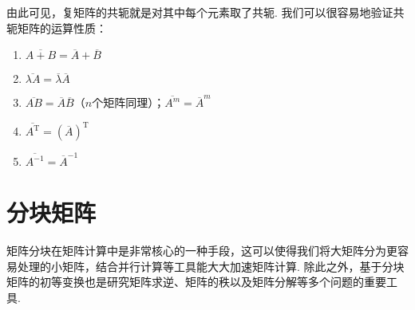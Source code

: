 由此可见，复矩阵的共轭就是对其中每个元素取了共轭. 我们可以很容易地验证共轭矩阵的运算性质：
\begin{enumerate}
    \item $\overline{A+B}=\overline{A}+\overline{B}$

    \item $\overline{\lambda A}=\overline{\lambda}\overline{A}$

    \item $\overline{AB}=\overline{A}\overline{B}$（$n$个矩阵同理）；$\overline{A^m}=\overline{A}^m$

    \item $\overline{A^\mathrm{T}}=(\overline{A})^\mathrm{T}$

    \item $\overline{A^{-1}}=\overline{A}^{-1}$
\end{enumerate}

\section{分块矩阵}

矩阵分块在矩阵计算中是非常核心的一种手段，这可以使得我们将大矩阵分为更容易处理的小矩阵，结合并行计算等工具能大大加速矩阵计算. 除此之外，基于分块矩阵的初等变换也是研究矩阵求逆、矩阵的秩以及矩阵分解等多个问题的重要工具.

